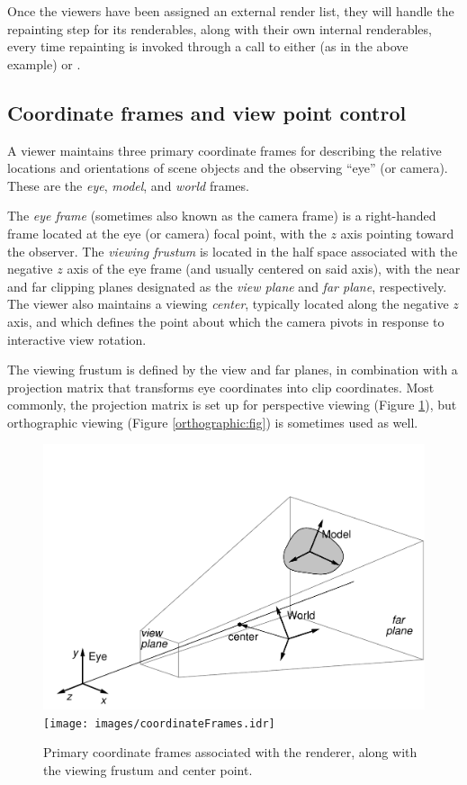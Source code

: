 Once the viewers have been assigned an external render list, they will
handle the repainting step for its renderables, along with their own
internal renderables, every time repainting is invoked through a call
to either  (as in the
above example) or .

\subsection{Coordinate frames and view point control}
\label{coordinateFrames:sec}

A viewer maintains three primary coordinate frames for describing the
relative locations and orientations of scene objects and the observing
``eye'' (or camera). These are the {\it eye}, {\it model}, and {\it
world} frames.

The {\it eye frame} (sometimes also known as the camera frame) is a
right-handed frame located at the eye (or camera) focal point, with
the $z$ axis pointing toward the observer. The {\it viewing frustum}
is located in the half space associated with the negative $z$ axis of
the eye frame (and usually centered on said axis), with the near and
far clipping planes designated as the {\it view plane} and {\it far
plane}, respectively. The viewer also maintains a viewing {\it
center}, typically located along the negative $z$ axis, and which
defines the point about which the camera pivots in response to
interactive view rotation.

The viewing frustum is defined by the view and far planes, in
combination with a projection matrix that transforms eye coordinates
into clip coordinates. Most commonly, the projection matrix is set up
for perspective viewing (Figure \ref{coordinateFrames:fig}), but
orthographic viewing (Figure \ref{orthographic:fig}) is sometimes used as
well.

%
\begin{figure}[t]
\begin{center}
\iflatexml
 \includegraphics[]{images/coordinateFrames}
\else
 \texttt{[image: images/coordinateFrames.idr]}
\fi
\end{center}
\caption{Primary coordinate frames associated with the renderer, along with
the viewing frustum and center point.}
\label{coordinateFrames:fig}
\end{figure}
%

